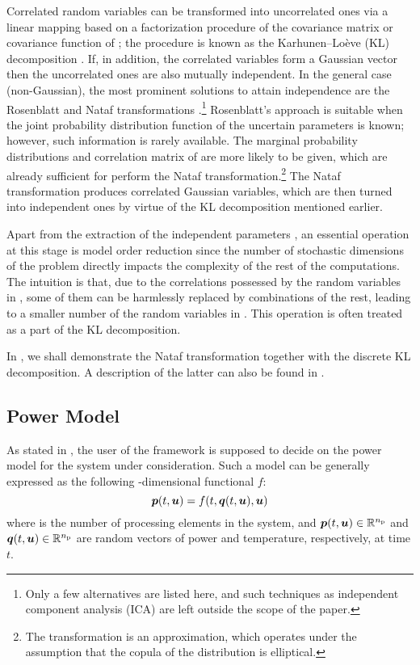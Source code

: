 Correlated random variables can be transformed into uncorrelated ones via a
linear mapping based on a factorization procedure of the covariance matrix or
covariance function of \vu; the procedure is known as the Karhunen--Lo\`{e}ve
(KL) decomposition \cite{ghanem1991}. If, in addition, the correlated variables
form a Gaussian vector then the uncorrelated ones are also mutually independent.
In the general case (non-Gaussian), the most prominent solutions to attain
independence are the Rosenblatt \cite{rosenblatt1952} and Nataf transformations
\cite{li2008}.\footnote{Only a few alternatives are listed here, and such
techniques as independent component analysis (ICA) are left outside the scope of
the paper.} Rosenblatt's approach is suitable when the joint probability
distribution function of the uncertain parameters \vu is known; however, such
information is rarely available. The marginal probability distributions and
correlation matrix of \vu are more likely to be given, which are already
sufficient for perform the Nataf transformation.\footnote{The transformation is
an approximation, which operates under the assumption that the copula of the
distribution is elliptical.} The Nataf transformation produces correlated
Gaussian variables, which are then turned into independent ones by virtue of the
KL decomposition mentioned earlier.

Apart from the extraction of the independent parameters \vz, an essential
operation at this stage is model order reduction since the number of stochastic
dimensions of the problem directly impacts the complexity of the rest of the
computations. The intuition is that, due to the correlations possessed by the
random variables in \vu, some of them can be harmlessly replaced by combinations
of the rest, leading to a smaller number of the random variables in \vz. This
operation is often treated as a part of the KL decomposition.

In , we shall demonstrate the Nataf transformation
together with the discrete KL decomposition. A description of the latter can
also be found in .

\subsection{Power Model}

As stated in , the user of the framework is supposed
to decide on the power model for the system under consideration. Such a model
can be generally expressed as the following \np-dimensional functional $f$:
\begin{equation} \elab{power-model}
  \vp(t, \vu) = f(t, \vq(t, \vu), \vu)
\end{equation}
where \np is the number of processing elements in the system, and $\boldsymbol{p}(t, \boldsymbol{u})
\in \mathbb{R}^{n_\mathrm{p}}$ and $\boldsymbol{q}(t, \boldsymbol{u}) \in \mathbb{R}^{n_\mathrm{p}}$ are random vectors of power and
temperature, respectively, at time $t$.

